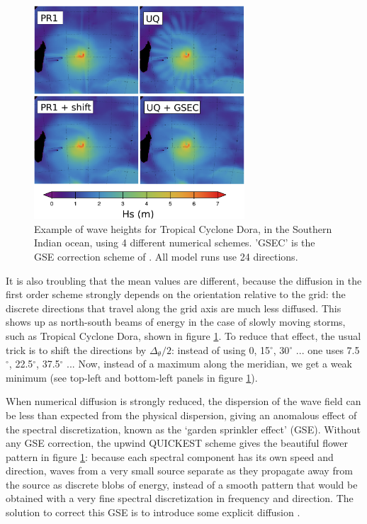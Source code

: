 \begin{figure}[htb]
\centerline{\includegraphics[width=0.7\textwidth]{FIGS_CH_MODEL/PR1_UQ_cyclone.pdf}}
\caption{Example of wave heights for Tropical Cyclone Dora, in the Southern Indian ocean, using 4 different numerical schemes. 
'GSEC' is the GSE correction scheme of 
\cite{Tolman2002a}. All model runs use 24 directions. }
\label{fig:PR1_UQ_space}
\end{figure}
It is also troubling that the mean values are different, because the diffusion in the first order scheme strongly depends on the orientation relative to the 
grid: the discrete directions that travel along the grid axis are much less diffused. This shows up as north-south beams of energy in the case
of slowly moving storms, such as Tropical Cyclone Dora, shown in figure \ref{fig:PR1_UQ_space}. To reduce that effect, the usual trick is to shift 
the directions by $\Delta_\theta/2$: instead of using 0, 15$^\circ$, 30$^\circ$ ... one uses 7.5$^\circ$, 22.5$^\circ$, 37.5$^\circ$ ... 
Now, instead of a maximum along the meridian, we get a weak minimum (see top-left and bottom-left 
panels in figure \ref{fig:PR1_UQ_space}). 


When numerical diffusion is strongly reduced, the dispersion of the wave field can be less than expected from the physical dispersion, giving 
an anomalous effect of the spectral discretization, known as 
the `garden sprinkler effect' (GSE). Without any GSE correction, the upwind QUICKEST scheme gives the beautiful flower pattern in 
figure \ref{fig:PR1_UQ_space}: because each spectral component has its own speed and direction, waves from a very small source separate as they 
propagate away from the source as discrete blobs of energy, instead of a smooth pattern that would be obtained with a very fine spectral 
discretization in frequency and direction. The solution to correct this GSE is to introduce some explicit diffusion \citep{Tolman2002a}.


